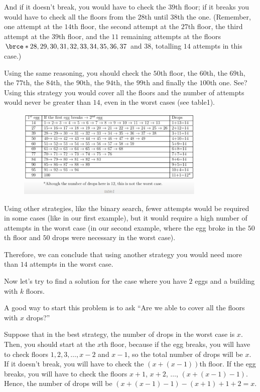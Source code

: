 And if it doesn't break, you would have to check the $39$th floor; if it
breaks you would have to check all the floors from the $28$th until $38$th
the one. (Remember, one attempt at the $14$th floor, the second attempt at
the $27$th floor, the third attempt at the $39$th floor, and the $11$
remaining attempts at the floors $\brce*{28,29,30,31,32,33,34,35,36,37}$ and
$38$, totalling $14$ attempts in this case.)

Using the same reasoning, you should check the $50$th floor, the $60$th, the
$69$th, the $77$th, the $84$th, the $90$th, the $94$th, the $99$th and
finally the $100$th one. See? Using this strategy you would cover all the
floors and the number of attempts would never be greater than $14$, even in
the worst cases (see table1).

\begin{figure}
\centering
\includegraphics[width=0.8\textwidth]{Images/figBrilliantEggDropTab}
\end{figure}

Using other strategies, like the binary search, fewer attempts would be
required in some cases (like in our first example), but it would require a
high number of attempts in the worst case (in our second example, where the
egg broke in the $50$th floor and $50$ drops were necessary in the worst
case).

Therefore, we can conclude that using another strategy you would need more
than $14$ attempts in the worst case.


Now let's try to find a solution for the case where you have $2$ eggs and a
building with $k$ floors.

A good way to start this problem is to ask ``Are we able to cover all the
floors with $x$ drops?''

Suppose that in the best strategy, the number of drops in the worst case is
$x$. Then, you should start at the $x$th floor, because if the egg breaks,
you will have to check floors $1,2,3,\ldots,x-2$ and $x-1$, so the total
number of drops will be $x$. If it doesn't break, you will have to check the
$(x+(x-1))$th floor. If the egg breaks, you will have to check the floors
$x+1$, $x+2$, $\ldots$, $(x+(x-1)-1)$. Hence, the number of drops will be
$(x+(x-1)-1)-(x+1)+1+2=x$.

